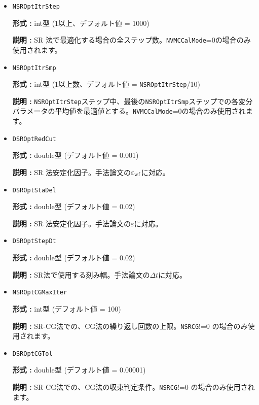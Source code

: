 \begin{itemize}
  {\bf 形式 :} int型 (1以上、{デフォルト値は副格子内部の並進ベクトルの数})

  {\bf 説明 :} 
  運動量・格子対称性の量子数射影の個数。
  TransSymファイルで指定した重みで上から\verb|NMPTrans|個まで使用する。{射影を行わない場合は1に設定する。}

 \item  \verb|NSROptItrStep|

{\bf 形式 :} int型 (1以上、デフォルト値 = 1000)

{\bf 説明 :} 
SR 法で最適化する場合の全ステップ数。\verb|NVMCCalMode|=0の場合のみ使用されます。
 
 \item  \verb|NSROptItrSmp|

{\bf 形式 :} int型 (1以上数、デフォルト値 = \verb|NSROptItrStep|/10)

{\bf 説明 :} \verb|NSROptItrStep|ステップ中、最後の\verb|NSROptItrSmp|ステップでの各変分パラメータの平均値を最適値とする。\verb|NVMCCalMode|=0の場合のみ使用されます。

\item   \verb|DSROptRedCut|
   
{\bf 形式 :} double型 (デフォルト値 = 0.001)

{\bf 説明 :} SR 法安定化因子。手法論文\cite{Tahara2008}の$\varepsilon_{\rm wf}$に対応。

 \item  \verb|DSROptStaDel| 
   
 {\bf 形式 :} double型 (デフォルト値 = 0.02)

  {\bf 説明 :} SR 法安定化因子。手法論文\cite{Tahara2008}の$\varepsilon$に対応。
     
\item \verb|DSROptStepDt|

{\bf 形式 :} double型 (デフォルト値 = 0.02)

{\bf 説明 :} {SR法で使用する刻み幅。手法論文\cite{Tahara2008}の$\Delta t$に対応。}
 
\item \verb|NSROptCGMaxIter|

{\bf 形式 :} int型 (デフォルト値 = 100)

{\bf 説明 :} {SR-CG法での、CG法の繰り返し回数の上限。\verb|NSRCG|!=0 の場合のみ使用されます。}
 
\item \verb|DSROptCGTol|

{\bf 形式 :} double型 (デフォルト値 = 0.00001)

{\bf 説明 :} {SR-CG法での、CG法の収束判定条件。\verb|NSRCG|!=0 の場合のみ使用されます。}
 

\end{itemize}
